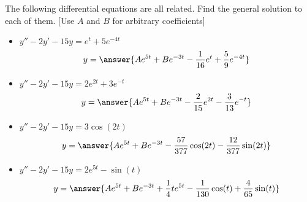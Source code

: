 \documentclass{ximera}
\begin{document}
\begin{exercise}
    The following differential equations are all related. Find the general solution to each of them. [Use $A$ and $B$ for arbitrary coefficients]%
    \begin{itemize}
        \item $y'' - 2y' - 15y = e^t + 5e^{-4t}$
        \[
            y = \answer{Ae^{5t} + Be^{-3t}  - \frac{1}{16}e^t + \frac{5}{9}e^{-4t}}
        \]
        \item $y'' - 2y' - 15y = 2e^{2t} + 3e^{-t}$
        \[
            y = \answer{Ae^{5t} + Be^{-3t}  - \frac{2}{15}e^{2t} - \frac{3}{13}e^{-t}}
        \]
        \item $y'' - 2y' - 15y = 3\cos(2t)$
        \[
            y = \answer{Ae^{5t} + Be^{-3t}  - \frac{57}{377}\cos(2t) - \frac{12}{377}\sin(2t)}
        \]
        \item $y'' - 2y' - 15y = 2e^{5t} - \sin(t)$
        \[
            y = \answer{Ae^{5t} + Be^{-3t}  + \frac{1}{4}te^{5t} - \frac{1}{130}\cos(t) + \frac{4}{65}\sin(t)}
        \]
    \end{itemize}
\end{exercise}
\end{document}
